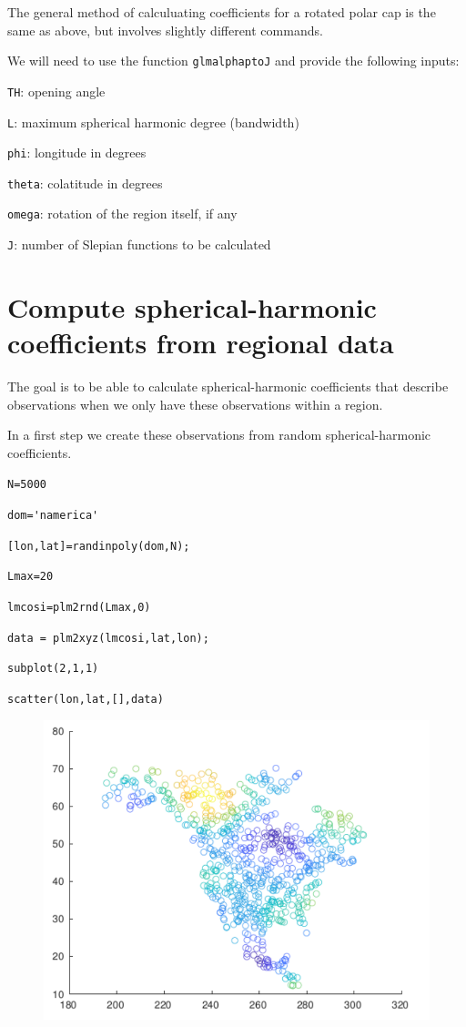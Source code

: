 \documentclass{article}
\begin{document}
\setlength{\parskip}{0.5cm plus4mm minus3mm}

The general method of calculuating coefficients for a rotated polar cap is the same as above, but involves slightly different commands.

We will need to use the function \verb!glmalphaptoJ! and provide the following inputs:

\verb!TH!: opening angle

\verb!L!: maximum spherical harmonic degree (bandwidth)

\verb!phi!: longitude in degrees

\verb!theta!: colatitude in degrees

\verb!omega!: rotation of the region itself, if any

\verb!J!: number of Slepian functions to be calculated

\section{Compute spherical-harmonic coefficients from regional data}

The goal is to be able to calculate spherical-harmonic coefficients that describe observations when we only have these observations within a region. 

In a first step we create these observations from random spherical-harmonic coefficients. 

\vspace{3mm}

\setlength{\parskip}{.1mm}

\verb!N=5000!

\verb!dom='namerica'!

\verb![lon,lat]=randinpoly(dom,N);!

\verb!Lmax=20!

\verb!lmcosi=plm2rnd(Lmax,0)!

\verb!data = plm2xyz(lmcosi,lat,lon);!

\verb!subplot(2,1,1)!

\verb!scatter(lon,lat,[],data)!

\begin{figure}[H]
\includegraphics[scale=.75]{namerica_randomdata}
\end{figure}
\end{document}
